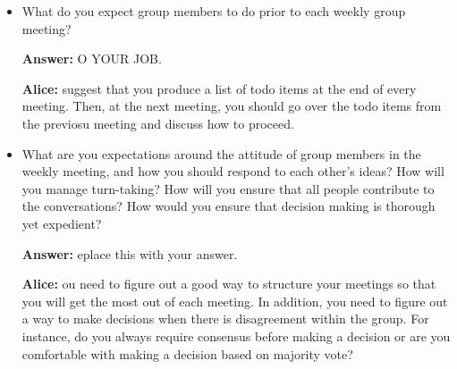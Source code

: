 \documentclass[12pt]{article}
\newenvironment{answer}[1]{
\color{blue}
	{\bf Answer:}
}{
}
\newenvironment{alice}[1]{
\color{magenta}
	{\bf Alice:}
}{
}
\begin{document}
\begin{itemize}
\begin{alice}

I highly recommend that you schedule a weekly meeting at the beginning of the term and that you make it mandatory for every group member to attend the weekly meeting.  This meeting will help you keep on track with the project, identify problems and address the problems promptly.  

\end{alice}

\begin{answer}

Wechat, Zoom, github.

Every Friday.

1 hour. 2pm - 3pm.

Zoom
\end{answer}

\item What do you expect group members to do prior to each weekly group meeting? 

\begin{answer}

DO YOUR JOB.
\end{answer}

\begin{alice}

I suggest that you produce a list of todo items at the end of every meeting.  Then, at the next meeting, you should go over the todo items from the previosu meeting and discuss how to proceed. 

\end{alice}


\item What are you expectations around the attitude of group members in the weekly meeting, and how you should respond to each other’s ideas?  How will you manage turn-taking? How will you ensure that all people contribute to the conversations? How would you ensure that decision making is thorough yet expedient?

\begin{answer}

Replace this with your answer.
\end{answer}

\begin{alice}

You need to figure out a good way to structure your meetings so that you will get the most out of each meeting.  In addition, you need to figure out a way to make decisions when there is disagreement within the group.  For instance, do you always require consensus before making a decision or are you comfortable with making a decision based on majority vote?  
\end{alice}


\end{itemize}
\end{document}
